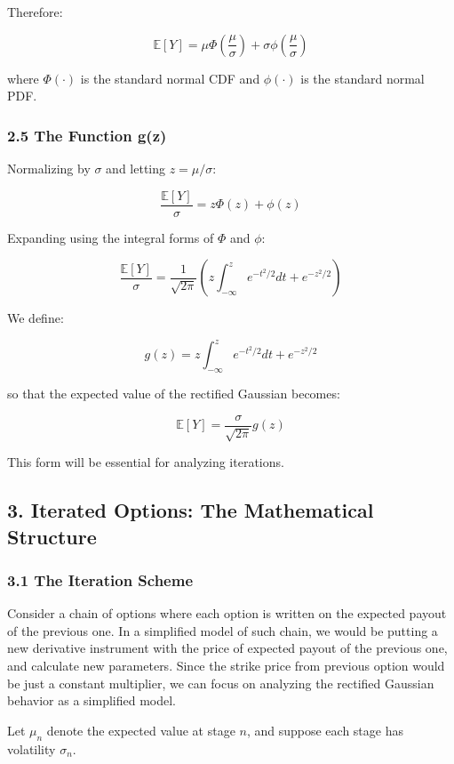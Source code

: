 \documentclass[
  11pt,
  openany]{article}
\begin{document}
Therefore:

\[\mathbb{E}[Y] = \mu \Phi\left(\frac{\mu}{\sigma}\right) + \sigma \phi\left(\frac{\mu}{\sigma}\right)\]

where \(\Phi(\cdot)\) is the standard normal CDF and \(\phi(\cdot)\) is
the standard normal PDF.

\subsubsection{2.5 The Function g(z)}\label{the-function-gz}

Normalizing by \(\sigma\) and letting \(z = \mu/\sigma\):

\[\frac{\mathbb{E}[Y]}{\sigma} = z\Phi(z) + \phi(z)\]

Expanding using the integral forms of \(\Phi\) and \(\phi\):

\[\frac{\mathbb{E}[Y]}{\sigma} = \frac{1}{\sqrt{2\pi}}\left( z \int_{-\infty}^{z} e^{-t^2/2} dt + e^{-z^2/2} \right)\]

We define:

\[g(z) = z \int_{-\infty}^{z} e^{-t^2/2} dt + e^{-z^2/2}\]

so that the expected value of the rectified Gaussian becomes:

\[\mathbb{E}[Y] = \frac{\sigma}{\sqrt{2\pi}} g(z)\]

This form will be essential for analyzing iterations.

\subsection{3. Iterated Options: The Mathematical
Structure}\label{iterated-options-the-mathematical-structure}

\subsubsection{3.1 The Iteration Scheme}\label{the-iteration-scheme}

Consider a chain of options where each option is written on the expected
payout of the previous one. In a simplified model of such chain, we
would be putting a new derivative instrument with the price of expected
payout of the previous one, and calculate new parameters. Since the
strike price from previous option would be just a constant multiplier,
we can focus on analyzing the rectified Gaussian behavior as a
simplified model.

Let \(\mu_n\) denote the expected value at stage \(n\), and suppose each
stage has volatility \(\sigma_n\).
\end{document}
